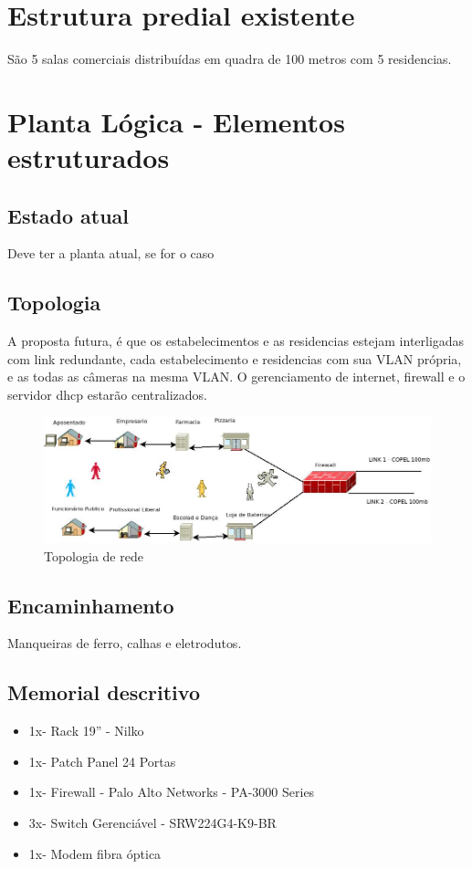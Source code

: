 \documentclass[	DIV=calc,%
							paper=a4,%
							fontsize=12pt,%
							onecolumn]{scrartcl}	 					%
\begin{document}
\section{Estrutura predial existente}
São 5 salas comerciais distribuídas em quadra de 100 metros com 5 residencias.

\section{Planta Lógica - Elementos estruturados}

\subsection{Estado atual}
Deve ter a planta atual, se for o caso

\subsection{Topologia}
A proposta futura, é que os estabelecimentos e as residencias estejam interligadas com link redundante, cada estabelecimento e residencias com sua VLAN própria, e as todas as câmeras na mesma VLAN. O gerenciamento de internet, firewall e o servidor dhcp estarão centralizados.

\begin{figure}
	\centering
	\includegraphics[]{rede}
	\caption{Topologia de rede}
	\label{rede}
\end{figure}

\subsection{Encaminhamento}
Manqueiras de ferro, calhas e eletrodutos.

\subsection{Memorial descritivo}
\begin{itemize}
\item 1x- Rack 19'' - Nilko
\item 1x- Patch Panel 24 Portas
\item 1x- Firewall - Palo Alto Networks - PA-3000 Series
\item 3x- Switch Gerenciável - SRW224G4-K9-BR
\item 1x- Modem fibra óptica
\end{itemize}
\end{document}
